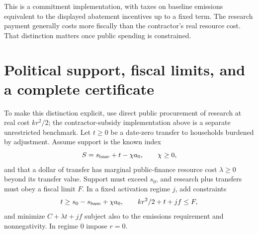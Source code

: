 \documentclass[11pt,a4paper]{article}
\theoremstyle{remark}
\begin{document}
This is a commitment implementation, with taxes on baseline emissions equivalent to the displayed abatement incentives up to a fixed term. The research payment generally costs more fiscally than the contractor's real resource cost. That distinction matters once public spending is constrained.

\section{Political support, fiscal limits, and a complete certificate}
To make this distinction explicit, use direct public procurement of research at real cost $kr^2/2$; the contractor-subsidy implementation above is a separate unrestricted benchmark. Let $t\ge0$ be a date-zero transfer to households burdened by adjustment. Assume support is the known index
\[
 S=s_{\rm base}+t-\chi a_0,\qquad \chi\ge0,
\]
and that a dollar of transfer has marginal public-finance resource cost $\lambda\ge0$ beyond its transfer value. Support must exceed $s_0$, and research plus transfers must obey a fiscal limit $F$. In a fixed activation regime $j$, add constraints
\[
 t\ge s_0-s_{\rm base}+\chi a_0,\qquad
 kr^2/2+t+jf\le F,
\]
and minimize $C+\lambda t+jf$ subject also to the emissions requirement and nonnegativity. In regime 0 impose $r=0$.
\end{document}
